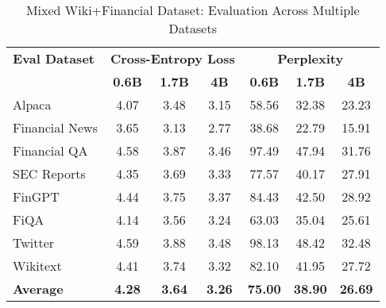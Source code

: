 
\begin{table}[h]
\centering
\caption[Mixed Wiki+Financial: Evaluation Results]{Mixed Wiki+Financial Dataset: Evaluation Across Multiple Datasets}
\label{tab:mixed_wiki_financial_results}
\begin{tabular}{l|ccc|ccc}
\hline
\textbf{Eval Dataset} & \multicolumn{3}{c|}{\textbf{Cross-Entropy Loss}} & \multicolumn{3}{c}{\textbf{Perplexity}} \\
\cline{2-4} \cline{5-7}
  & \textbf{0.6B} & \textbf{1.7B} & \textbf{4B} & \textbf{0.6B} & \textbf{1.7B} & \textbf{4B} \\
Alpaca & 4.07 & 3.48 & 3.15 & 58.56 & 32.38 & 23.23 \\
Financial News & 3.65 & 3.13 & 2.77 & 38.68 & 22.79 & 15.91 \\
Financial QA & 4.58 & 3.87 & 3.46 & 97.49 & 47.94 & 31.76 \\
SEC Reports & 4.35 & 3.69 & 3.33 & 77.57 & 40.17 & 27.91 \\
FinGPT & 4.44 & 3.75 & 3.37 & 84.43 & 42.50 & 28.92 \\
FiQA & 4.14 & 3.56 & 3.24 & 63.03 & 35.04 & 25.61 \\
Twitter & 4.59 & 3.88 & 3.48 & 98.13 & 48.42 & 32.48 \\
Wikitext & 4.41 & 3.74 & 3.32 & 82.10 & 41.95 & 27.72 \\
\hline
\textbf{Average} & \textbf{4.28} & \textbf{3.64} & \textbf{3.26} & \textbf{75.00} & \textbf{38.90} & \textbf{26.69} \\
\hline
\end{tabular}
\end{table}
